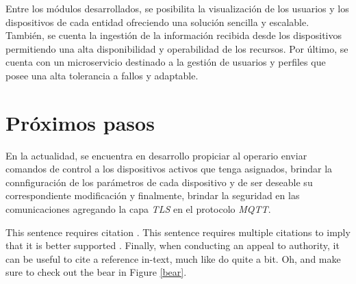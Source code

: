 \documentclass[10pt, a4paper, twocolumn]{article} %
\begin{document}
Entre los módulos desarrollados, se posibilita la visualización de los usuarios y los dispositivos de cada entidad ofreciendo una solución sencilla y escalable. También, se cuenta la ingestión de la información recibida desde los dispositivos permitiendo una alta disponibilidad y operabilidad de los recursos. Por último, se cuenta con un microservicio destinado a la gestión de usuarios y perfiles que posee una alta tolerancia a fallos y adaptable.


\section{Próximos pasos}

En la actualidad, se encuentra en desarrollo propiciar al operario enviar comandos de control a los dispositivos activos que tenga asignados, brindar la connfiguración de los parámetros de cada dispositivo y de ser deseable su correspondiente modificación y finalmente, brindar la seguridad en las comunicaciones agregando la capa \textit{TLS} en el protocolo \textit{MQTT}. 



This sentence requires citation \citep{Reference1}. This sentence requires multiple citations to imply that it is better supported \citep{Reference2,Reference3}. Finally, when conducting an appeal to authority, it can be useful to cite a reference in-text, much like \cite{Reference1} do quite a bit. Oh, and make sure to check out the bear in Figure \ref{bear}.


\printbibliography[title={Bibliography}] %

\end{document}

